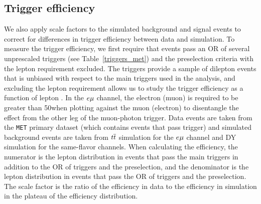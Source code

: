 \subsection{Trigger efficiency}
\label{trigger_eff}
We also apply scale factors to the simulated background and signal events to correct for differences in trigger efficiency between data and simulation. To measure the trigger efficiency, we first require that events pass an OR of several unprescaled \ptmiss triggers (see Table~\ref{triggers_met}) and the preselection criteria with the lepton \pt requirement excluded. The \ptmiss triggers provide a sample of dilepton events that is unbiased with respect to the main triggers used in the analysis, and excluding the lepton \pt requirement allows us to study the trigger efficiency as a function of lepton \pt. In the $e{\mu}$ channel, the electron (muon) \pt is required to be greater than 50\GeV when plotting against the muon (electron) \pt to disentangle the effect from the other leg of the muon-photon trigger. Data events are taken from the \texttt{MET} primary dataset (which contains events that pass \ptmiss trigger) and simulated background events are taken from $t\overline{t}$ simulation for the $e{\mu}$ channel and DY simulation for the same-flavor channels. When calculating the efficiency, the numerator is the lepton \pt distribution in events that pass the main triggers in addition to the OR of \ptmiss triggers and the preselection, and the denominator is the lepton \pt distribution in events that pass the OR of \ptmiss triggers and the preselection. The scale factor is the ratio of the efficiency in data to the efficiency in simulation in the plateau of the efficiency distribution.



\pagebreak